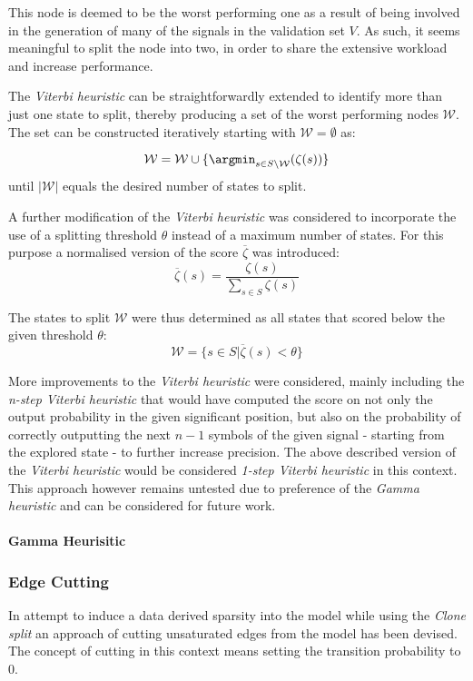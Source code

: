 This node is deemed to be the worst performing one as a result of being involved in the generation of many of the signals in the validation set $V$. As such, it seems meaningful to split the node into two, in order to share the extensive workload and increase performance.

The \emph{Viterbi heuristic} can be straightforwardly extended to identify more than just one state to split, thereby producing a set of the worst performing nodes $\mathcal{W}$. The set can be constructed iteratively starting with $\mathcal{W} = \emptyset$ as:

$$\mathcal{W} = \mathcal{W} \cup \{\argmin_{s\in S\setminus \mathcal{W}}(\zeta(s))\}$$
until $|\mathcal{W}|$ equals the desired number of states to split.

A further modification of the \emph{Viterbi heuristic} was considered to incorporate the use of a splitting threshold $\theta$ instead of a maximum number of states. For this purpose a normalised version of the score $\overline{\zeta}$ was introduced:
$$\overline{\zeta}(s) = \frac{\zeta(s)}{\sum_{s\in S}\zeta(s)}$$

The states to split $\mathcal{W}$ were thus determined as all states that scored below the given threshold $\theta$:
$$\mathcal{W} = \{s\in S|\overline\zeta(s) < \theta\}$$

More improvements to the \emph{Viterbi heuristic} were considered, mainly including the \emph{n-step Viterbi heuristic} that would have computed the score on not only the output probability in the given significant position, but also on the probability of correctly outputting the next $n -1$ symbols of the given signal - starting from the explored state - to further increase precision. The above described version of the \emph{Viterbi heuristic} would be considered \emph{1-step Viterbi heuristic} in this context. This approach however remains untested due to preference of the \emph{Gamma heuristic} and can be considered for future work.

\paragraph{Gamma Heurisitic}

\subsubsection{Edge Cutting}
In attempt to induce a data derived sparsity into the model while using the \emph{Clone split} an approach of cutting unsaturated edges from the model has been devised. The concept of cutting in this context means setting the transition probability to $0$.

